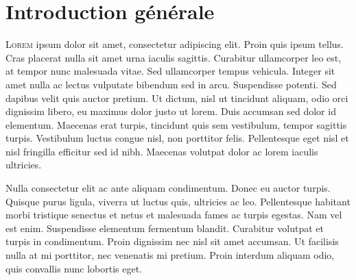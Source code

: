 \chapter*{Introduction générale}

\lettrine[lines=3]{L}{orem} ipsum dolor sit amet, consectetur adipiscing elit. Proin quis ipsum tellus. Cras placerat nulla sit amet urna iaculis sagittis. Curabitur ullamcorper leo est, at tempor nunc malesuada vitae. Sed ullamcorper tempus vehicula. Integer sit amet nulla ac lectus vulputate bibendum sed in arcu. Suspendisse potenti. Sed dapibus velit quis auctor pretium. Ut dictum, nisl ut tincidunt aliquam, odio orci dignissim libero, eu maximus dolor justo ut lorem. Duis accumsan sed dolor id elementum. Maecenas erat turpis, tincidunt quis sem vestibulum, tempor sagittis turpis. Vestibulum luctus congue nisl, non porttitor felis. Pellentesque eget nisl et nisl fringilla efficitur sed id nibh. Maecenas volutpat dolor ac lorem iaculis ultricies.

\par Nulla consectetur elit ac ante aliquam condimentum. Donec eu auctor turpis. Quisque purus ligula, viverra ut luctus quis, ultricies ac leo. Pellentesque habitant morbi tristique senectus et netus et malesuada fames ac turpis egestas. Nam vel est enim. Suspendisse elementum fermentum blandit. Curabitur volutpat et turpis in condimentum. Proin dignissim nec nisl sit amet accumsan. Ut facilisis nulla at mi porttitor, nec venenatis mi pretium. Proin interdum aliquam odio, quis convallis nunc lobortis eget.